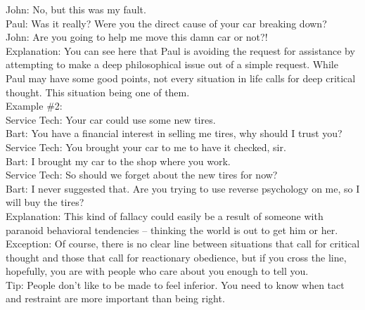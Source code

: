 \documentclass[a4paper,12pt,single,pdftex]{scrartcl}
\begin{document}
    
      John: No, but this was my fault.
    \\

    
      Paul: Was it really? Were you the direct cause of your car breaking down?
    \\

    
      John: Are you going to help me move this damn car or not?!
    \\

    
      Explanation: You can see here that Paul is avoiding the request for assistance by attempting to make a deep philosophical issue out of a simple request.  While Paul may have some good points, not every situation in life calls for deep critical thought.  This situation being one of them.
    \\

    
      Example \#2:
    \\

    
      Service Tech: Your car could use some new tires.
    \\

    
      Bart: You have a financial interest in selling me tires, why should I trust you?
    \\

    
      Service Tech: You brought your car to me to have it checked, sir.
    \\

    
      Bart: I brought my car to the shop where you work.
    \\

    
      Service Tech: So should we forget about the new tires for now?
    \\

    
      Bart: I never suggested that.  Are you trying to use reverse psychology on me, so I will buy the tires?
    \\

    
      Explanation: This kind of fallacy could easily be a result of someone with paranoid behavioral tendencies -- thinking the world is out to get him or her.
    \\

    
      Exception: Of course, there is no clear line between situations that call for critical thought and those that call for reactionary obedience, but if you cross the line, hopefully, you are with people who care about you enough to tell you.
    \\

    
      Tip: People don’t like to be made to feel inferior.  You need to know when tact and restraint are more important than being right.
    \\
\end{document}

